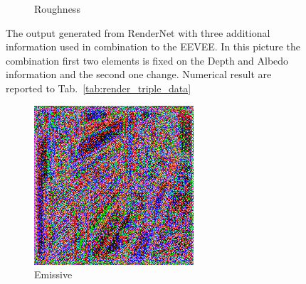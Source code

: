 \begin{figure}[h!]
\begin{subfigure}[b]{0.175\textwidth}
     \caption{Roughness}
    \end{subfigure}
    \caption{The output generated from RenderNet with three additional information used in combination to the EEVEE. In this picture the combination first two elements is fixed on the Depth and Albedo information and the second one change. Numerical result are reported to Tab.~\ref{tab:render_triple_data}}
    \label{fig:triple_input_base_depth_albedo}
\end{figure}

\begin{figure}[h!]
    \centering
    \begin{subfigure}[b]{0.175\textwidth}
     \includegraphics[width=\textwidth]{figures/result/triple/albedo_normal_emissive/1.png}
     \caption{Emissive}\label{subfig:1}
    \end{subfigure}
    ~
    \begin{subfigure}[b]{0.175\textwidth}

\end{subfigure}
\end{figure}
